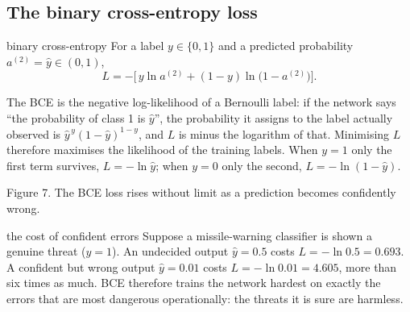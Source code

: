 \documentclass[11pt]{article}
\begin{document}
\subsection{The binary cross-entropy loss}
\begin{definition}{binary cross-entropy}
For a label $y\in\{0,1\}$ and a predicted probability $a^{(2)}=\hat y\in(0,1)$,
\[
L=-\bigl[\,y\ln a^{(2)}+(1-y)\ln\bigl(1-a^{(2)}\bigr)\bigr].
\]
\end{definition}
The BCE is the negative log-likelihood of a Bernoulli label: if the network says ``the probability of class 1 is $\hat y$'', the probability it assigns to the label actually observed is $\hat y^{\,y}(1-\hat y)^{1-y}$, and $L$ is minus the logarithm of that. Minimising $L$ therefore maximises the likelihood of the training labels. When $y=1$ only the first term survives, $L=-\ln\hat y$; when $y=0$ only the second, $L=-\ln(1-\hat y)$.

\begin{center}

\small Figure 7. The BCE loss rises without limit as a prediction becomes confidently wrong.
\end{center}

\begin{defence}{the cost of confident errors}
Suppose a missile-warning classifier is shown a genuine threat ($y=1$). An undecided output $\hat y=0.5$ costs $L=-\ln 0.5=0.693$. A confident but wrong output $\hat y=0.01$ costs $L=-\ln 0.01=4.605$, more than six times as much. BCE therefore trains the network hardest on exactly the errors that are most dangerous operationally: the threats it is sure are harmless.
\end{defence}
\end{document}
